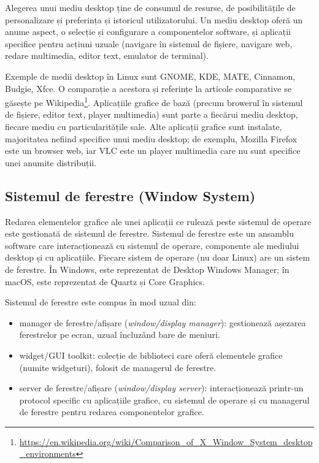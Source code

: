 Alegerea unui mediu desktop ține de consumul de resurse, de posibilitățile de personalizare și preferința și istoricul utilizatorului.
Un mediu desktop oferă un anume aspect, o selecție și configurare a componentelor software, și aplicații specifice pentru acțiuni uzuale (navigare în sistemul de fișiere, navigare web, redare multimedia, editor text, emulator de terminal).

Exemple de medii desktop în Linux sunt GNOME, KDE, MATE, Cinnamon, Budgie, Xfce.
O comparație a acestora și referințe la articole comparative se găsește pe Wikipedia\footnote{\url{https://en.wikipedia.org/wiki/Comparison\_of\_X\_Window\_System\_desktop\_environments}}.
Aplicațiile grafice de bază (precum browerul în sistemul de fișiere, editor text, player multimedia) sunt parte a fiecărui mediu desktop, fiecare mediu cu particularitățile sale.
Alte aplicații grafice sunt instalate, majoritatea nefiind specifice unui mediu desktop;
de exemplu, Mozilla Firefox este un browser web, iar VLC este un player multimedia care nu sunt specifice unei anumite distribuții.

\subsection{Sistemul de ferestre (Window System)}
\label{sec:ui:window-system}

Redarea elementelor grafice ale unei aplicații ce rulează peste sistemul de operare este gestionată de sistemul de ferestre.
Sistemul de ferestre este un ansamblu software care interacționează cu sistemul de operare, componente ale mediului desktop și cu aplicațiile.
Fiecare sistem de operare (nu doar Linux) are un sistem de ferestre.
În Windows, este reprezentat de Desktop Windows Manager;
în macOS, este reprezentat de Quartz și Core Graphics.

Sistemul de ferestre este compus în mod uzual din:

\begin{itemize}
  \item manager de ferestre/afișare (\textit{window/display manager}): gestionează așezarea ferestrelor pe ecran, uzual încluzând bare de meniuri.
  \item widget/GUI toolkit: colecție de biblioteci care oferă elementele grafice (numite widgeturi), folosit de managerul de ferestre.
  \item server de ferestre/afișare (\textit{window/display server}): interacționează printr-un protocol specific cu aplicațiile grafice, cu sistemul de operare și cu managerul de ferestre pentru redarea componentelor grafice.
\end{itemize}

